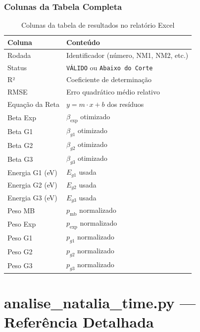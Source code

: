 \documentclass[12pt,a4paper]{report}
\begin{document}
\subsection{Colunas da Tabela Completa}

\begin{table}[h!]
  \centering
  \caption{Colunas da tabela de resultados no relatório Excel}
  \begin{tabular}{ll}
    \toprule
    \textbf{Coluna} & \textbf{Conteúdo} \\
    \midrule
    Rodada         & Identificador (número, NM1, NM2, etc.) \\
    Status         & \texttt{VÁLIDO} ou \texttt{Abaixo do Corte} \\
    R²             & Coeficiente de determinação \\
    RMSE           & Erro quadrático médio relativo \\
    Equação da Reta & $y = m \cdot x + b$ dos resíduos \\
    Beta Exp       & $\beta_{\text{exp}}$ otimizado \\
    Beta G1        & $\beta_{g1}$ otimizado \\
    Beta G2        & $\beta_{g2}$ otimizado \\
    Beta G3        & $\beta_{g3}$ otimizado \\
    Energia G1 (eV) & $E_{g1}$ usada \\
    Energia G2 (eV) & $E_{g2}$ usada \\
    Energia G3 (eV) & $E_{g3}$ usada \\
    Peso MB        & $p_{\text{mb}}$ normalizado \\
    Peso Exp       & $p_{\text{exp}}$ normalizado \\
    Peso G1        & $p_{g1}$ normalizado \\
    Peso G2        & $p_{g2}$ normalizado \\
    Peso G3        & $p_{g3}$ normalizado \\
    \bottomrule
  \end{tabular}
\end{table}


\chapter{analise\_natalia\_time.py — Referência Detalhada}
\label{cap:analise}
\end{document}
